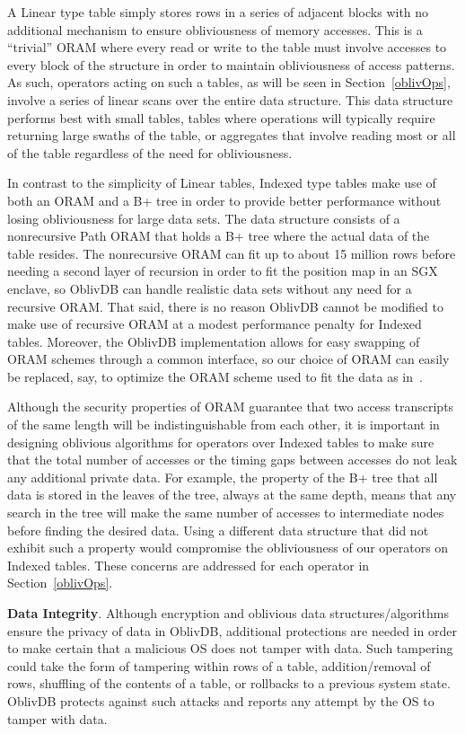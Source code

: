 \documentclass[letterpaper,twocolumn,10pt]{article}
\def\name/{OblivDB}
\begin{document}
A Linear type table simply stores rows in a series of adjacent blocks with no additional mechanism to ensure obliviousness of memory accesses. This is a ``trivial'' ORAM where every read or write to the table must involve accesses to every block of the structure in order to maintain obliviousness of access patterns. As such, operators acting on such a tables, as will be seen in Section~\ref{oblivOps}, involve a series of linear scans over the entire data structure. This data structure performs best with small tables, tables where operations will typically require returning large swaths of the table, or aggregates that involve reading most or all of the table regardless of the need for obliviousness.

In contrast to the simplicity of Linear tables, Indexed type tables make use of both an ORAM and a B+ tree in order to provide better performance without losing obliviousness for large data sets. The data structure consists of a nonrecursive Path ORAM that holds a B+ tree where the actual data of the table resides. The nonrecursive ORAM can fit up to about 15 million rows before needing a second layer of recursion in order to fit the position map in an SGX enclave, so \name/ can handle realistic data sets without any need for a recursive ORAM. That said, there is no reason \name/ cannot be modified to make use of recursive ORAM at a modest performance penalty for Indexed tables. Moreover, the \name/ implementation allows for easy swapping of ORAM schemes through a common interface, so our choice of ORAM can easily be replaced, say, to optimize the ORAM scheme used to fit the data as in~\cite{ZWR+16}.

Although the security properties of ORAM guarantee that two access transcripts of the same length will be indistinguishable from each other, it is important in designing oblivious algorithms for operators over Indexed tables to make sure that the total number of accesses or the timing gaps between accesses do not leak any additional private data. For example, the property of the B+ tree that all data is stored in the leaves of the tree, always at the same depth, means that any search in the tree will make the same number of accesses to intermediate nodes before finding the desired data. Using a different data structure that did not exhibit such a property would compromise the obliviousness of our operators on Indexed tables. These concerns are addressed for each operator in Section~\ref{oblivOps}.  

 \noindent \textbf{Data Integrity}. 
Although encryption and oblivious data structures/algorithms ensure the privacy of data in \name/, additional protections are needed in order to make certain that a malicious OS does not tamper with data. Such tampering could take the form of tampering within rows of a table, addition/removal of rows, shuffling of the contents of a table, or rollbacks to a previous system state. \name/ protects against such attacks and reports any attempt by the OS to tamper with data. 
\end{document}
